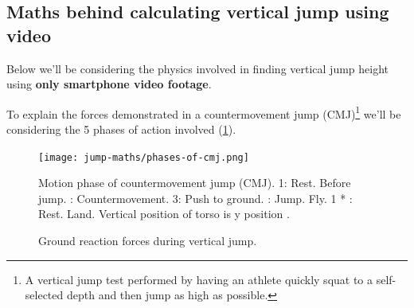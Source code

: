 \subsection{Maths behind calculating vertical jump using video}
\label{research:jump-maths}
Below we'll be considering the physics \cite{hoopsgeek-maths} involved in finding vertical jump height using
\textbf{only smartphone video footage}.
\par
To explain the forces demonstrated in a countermovement jump (CMJ)\footnote{A vertical jump test performed by having an athlete quickly squat to a self-selected depth and then jump as high as possible.}
we'll be considering the 5 phases of action involved (\cref{fig:jump-phases}).
\begin{figure}[H]
	\centering
	\begin{minipage}[c]{0.5\textwidth}
		\caption{Motion phase of countermovement jump (CMJ). 1: Rest. Before jump. : Countermovement. 3: Push to ground. : Jump. Fly. 1 * : Rest. Land. \linebreak Vertical position of torso is y position \cite{jumping-phases-picture}.}
		\label{fig:jump-phases}
	\end{minipage}%
	\begin{minipage}[c]{0.5\textwidth}
		\texttt{[image: jump-maths/phases-of-cmj.png]}
	\end{minipage}
\end{figure}
\vspace*{-5mm}
\begin{figure}[H]
	\centering
	
	\vspace*{-5mm}
	\caption{Ground reaction forces during vertical jump.}
	\label{fig:jump-phases-graph}
\end{figure}
\pagebreak

